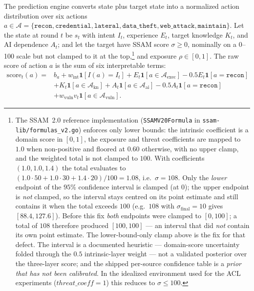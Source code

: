 \documentclass[11pt]{article}
\newcommand{\act}[1]{\texttt{#1}}
\begin{document}
The prediction engine converts state plus target state into a normalized
action distribution over six actions $a \in \mathcal{A} = \{\act{recon},
\act{credential}, \act{lateral}, \act{data\_theft}, \act{web\_attack},
\act{maintain}\}$. Let the state at round $t$ be $s_t$ with intent $I_t$,
experience $E_t$, target knowledge $K_t$, and AI dependence $A_t$; and let
the target have SSAM score $\sigma \ge 0$, nominally on a 0--100 scale but
not clamped to it at the top,\footnote{The SSAM~2.0 reference implementation
(\texttt{SSAMV20Formula} in \texttt{ssam-lib/formulas\_v2.go}) enforces only
lower bounds: the intrinsic coefficient is a domain score in $[0,1]$, the
exposure and threat coefficients are mapped to $1.0$ when non-positive and
floored at $0.60$ otherwise, with no upper clamp, and the weighted total is
not clamped to $100$. With coefficients $(1.0,1.0,1.4)$ the total evaluates
to $(1.0\cdot50+1.0\cdot30+1.4\cdot20)/100=1.08$, i.e.\ $\sigma=108$. Only
the \emph{lower} endpoint of the $95\%$ confidence interval is clamped (at
$0$); the upper endpoint is \emph{not} clamped, so the interval stays centred
on its point estimate and still contains it when the total exceeds $100$
(e.g.\ $108$ with $\sigma_{\mathrm{final}}=10$ gives $[88.4,127.6]$). Before
this fix \emph{both} endpoints were clamped to $[0,100]$; a total of $108$
therefore produced $[100,100]$ --- an interval that did \emph{not} contain its
own point estimate. The lower-bound-only clamp above is the fix for that
defect. The interval is a documented heuristic --- domain-score uncertainty
folded through the $0.5$ intrinsic-layer weight --- not a validated posterior
over the three-layer score; and the shipped per-source confidence table is a
\emph{prior that has not been calibrated}.
In the idealized environment used for the ACL experiments
($\mathit{threat\_coeff}=1$) this reduces to $\sigma\le100$.}
and exposure $\rho \in [0,1]$. The raw score of action $a$ is the sum of six
interpretable terms:
\begin{equation}
\label{eq:score}
\begin{aligned}
\mathrm{score}_t(a) ={}& b_a + w_{\mathrm{int}}\mathbf{1}[I(a)=I_t]
+ E_t\mathbf{1}[a\in\mathcal{A}_{\mathrm{exec}}]
-0.5E_t\mathbf{1}[a=\act{recon}]\\
&+ K_t\mathbf{1}[a\in\mathcal{A}_{\mathrm{kn}}]
+ A_t\mathbf{1}[a\in\mathcal{A}_{\mathrm{ai}}]
-0.5A_t\mathbf{1}[a=\act{recon}]\\
&+ w_{\mathrm{vuln}}v_t\mathbf{1}[a\in\mathcal{A}_{\mathrm{vuln}}].
\end{aligned}
\end{equation}
\end{document}
